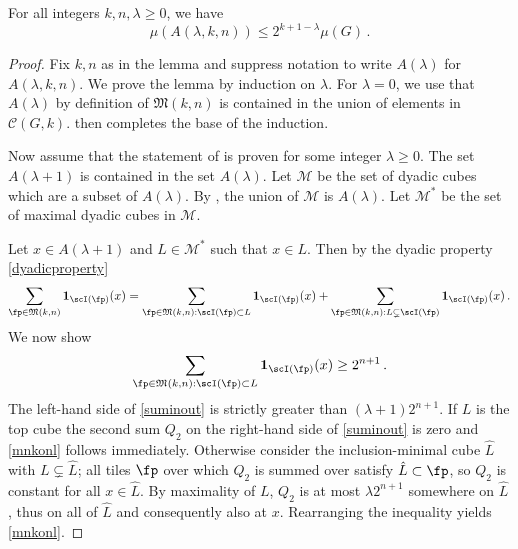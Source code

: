 \begin{lemma}
\label{John-Nirenberg}
\leanok
{}
    For all integers $k,n,\lambda\ge 0$, we have
    \begin{equation}\label{alambdameasure}
        \mu(A(\lambda,k,n)) \le 2^{k+1-\lambda}\mu(G)\,.
    \end{equation}

\end{lemma}
\begin{proof}
\leanok
Fix $k,n$ as in the lemma
and suppress notation to write
$A(\lambda)$ for $A(\lambda,k,n)$.
We prove the lemma by induction on $\lambda$.
For $\lambda=0$, we use that $A(\lambda)$ by definition of $\mathfrak{M}(k,n)$ is contained in the union of elements in $ \mathcal{C}(G,k)$.  then completes the base of the induction.

Now assume that the statement of 
is proven for some integer $\lambda\ge 0$.
The set $A(\lambda+1)$ is contained in the set $A(\lambda)$.
Let $\mathcal{M}$ be the set of dyadic cubes which are a subset of $A(\lambda)$. By , the union of $\mathcal{M}$ is $A(\lambda)$.
Let $\mathcal{M}^*$ be the set of maximal dyadic cubes in $\mathcal{M}$.

Let $x\in A(\lambda+1)$ and $L\in \mathcal{M}^*$ such that $x\in L$. Then by the dyadic property \eqref{dyadicproperty}
\begin{equation}\label{suminout}
    \sum_{\fp \in {\mathfrak{M}}(k,n)} \mathbf{1}_{\scI(\fp)}(x) =
    \sum_{\fp \in {\mathfrak{M}}(k,n):\scI(\fp) \subset L} \mathbf{1}_{\scI(\fp)}(x) +
    \sum_{\fp \in {\mathfrak{M}}(k,n):L \subsetneq \scI(\fp)} \mathbf{1}_{\scI(\fp)}(x)\,.
\end{equation}
We now show
\begin{equation}\label{mnkonl}
    \sum_{\fp \in {\mathfrak{M}}(k,n):\scI(\fp) \subset L} \mathbf{1}_{\scI(\fp)}(x)\ge 2^{n+1}\,.
\end{equation}
The left-hand side of \eqref{suminout} is strictly greater than $(\lambda+1)2^{n+1}$.
If $L$ is the top cube the second sum $Q_2$ on the right-hand side of \eqref{suminout} is zero and
\eqref{mnkonl} follows immediately. Otherwise consider the inclusion-minimal cube $\hat{L}$ with $L\subsetneq\hat{L}$;
all tiles $\fp$ over which $Q_2$ is summed over satisfy $\hat{L}\subset\fp$, so $Q_2$ is constant for all $x\in\hat{L}$.
By maximality of $L$, $Q_2$ is at most $\lambda 2^{n+1}$ somewhere on $\hat{L}$,
thus on all of $\hat{L}$ and consequently also at $x$. Rearranging the inequality yields \eqref{mnkonl}.


\end{proof}
